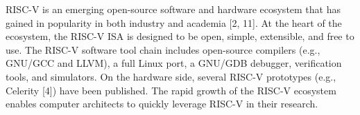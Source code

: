 
RISC-V is an emerging open-source software and hardware ecosystem that has gained in popularity in both industry and academia [2, 11]. At the heart of the ecosystem, the RISC-V ISA is designed to be open, simple, extensible, and free to use. The RISC-V software tool chain includes open-source compilers (e.g., GNU/GCC and LLVM), a full Linux port, a GNU/GDB debugger, verification tools, and simulators. On the hardware side, several RISC-V prototypes (e.g., Celerity [4]) have been published. The rapid growth of the RISC-V ecosystem enables computer architects to quickly leverage RISC-V in their research.


